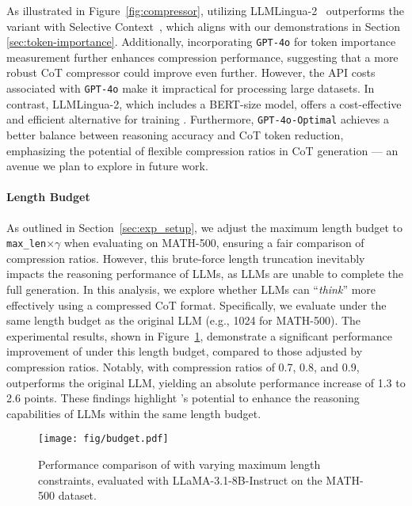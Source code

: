 As illustrated in Figure~\ref{fig:compressor}, \method utilizing LLMLingua-2~\cite{pan:2024llmlingua2} outperforms the variant with Selective Context~\cite{li:2023selective}, which aligns with our demonstrations in Section \ref{sec:token-importance}. Additionally, incorporating \texttt{GPT-4o} for token importance measurement further enhances compression performance, suggesting that a more robust CoT compressor could improve \method even further. However, the API costs associated with \texttt{GPT-4o} make it impractical for processing large datasets. In contrast, LLMLingua-2, which includes a BERT-size model, offers a cost-effective and efficient alternative for training \method. Furthermore, \texttt{GPT-4o-Optimal} achieves a better balance between reasoning accuracy and CoT token reduction, emphasizing the potential of flexible compression ratios in CoT generation --- an avenue we plan to explore in future work.

\paragraph{Length Budget} 
As outlined in Section~\ref{sec:exp_setup}, we adjust the maximum length budget to \texttt{max\_len}$\times\gamma$ when evaluating \method on MATH-500, ensuring a fair comparison of compression ratios. However, this brute-force length truncation inevitably impacts the reasoning performance of LLMs, as LLMs are unable to complete the full generation. In this analysis, we explore whether LLMs can ``\textit{think}'' more effectively using a compressed CoT format. Specifically, we evaluate \method under the same length budget as the original LLM (e.g., 1024 for MATH-500). The experimental results, shown in Figure~\ref{fig:budget}, demonstrate a significant performance improvement of \method under this length budget, compared to those adjusted by compression ratios. Notably, with compression ratios of 0.7, 0.8, and 0.9, \method outperforms the original LLM, yielding an absolute performance increase of 1.3 to 2.6 points. These findings highlight \method's potential to enhance the reasoning capabilities of LLMs within the same length budget.

\begin{figure}[t]
\centering
    \texttt{[image: fig/budget.pdf]}
    \caption{Performance comparison of \method with varying maximum length constraints, evaluated with LLaMA-3.1-8B-Instruct on the MATH-500 dataset.}
    \label{fig:budget}
\end{figure}

